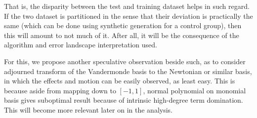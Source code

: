 That is, the disparity between the test and training dataset helps in such regard. If the two dataset is partitioned in the sense that their deviation is practically the same (which can be done using synthetic generation for a control group), then this will amount to not much of it. After all, it will be the consequence of the algorithm and error landscape interpretation used. 

For this, we propose another speculative observation beside such, as to consider adjourned transform of the Vandermonde basis to the Newtonian or similar basis, in which the effects and motion can be easily observed, as least easy. This is because aside from mapping down to $[-1,1]$, normal polynomial on monomial basis gives suboptimal result because of intrinsic high-degree term domination. This will become more relevant later on in the analysis. 